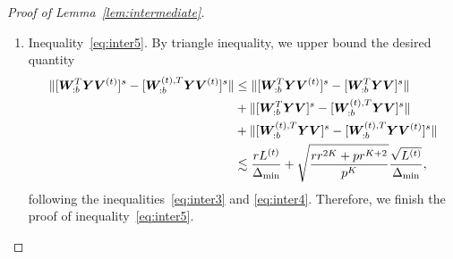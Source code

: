 \documentclass[lettersize,onecolumn,journal]{IEEEtran}
\theoremstyle{definition}
\theoremstyle{definition}
\newcommand{\off}[1]{\left[#1\right]}
\newcommand{\offf}[1]{\left\{#1\right\}}
\begin{document}
\begin{proof}[Proof of Lemma~\ref{lem:intermediate}]
\begin{enumerate}
    \item Inequality~\eqref{eq:inter5}. By triangle inequality, we upper bound the desired quantity 
    \begin{align}
        \lVert [ \bm{W}_{:b}^T \bm Y \bm{V}^{(t)} ]^s   -  [ \bm{W}_{:b}^{(t), T} \bm Y \bm{V}^{(t)} ]^s \rVert &\leq \lVert[ \bm{W}_{:b}^T \bm Y \bm{V}^{(t)} ]^s - [ \bm{W}_{:b}^T \bm Y \bm{V} ]^s \rVert \\
        & + \lVert[\bm{W}_{:b}^T \bm Y \bm{V} ]^s  - [ \bm{W}_{:b}^{(t),T} \bm Y \bm{V} ]^s \rVert \\
        &+ \lVert[\bm{W}_{:b}^{(t),T} \bm Y \bm{V} ]^s  -  [\bm{W}_{:b}^{(t), T} \bm Y \bm{V}^{(t)} ]^s \rVert\\
        &\lesssim \frac{r L^{(t)}}{\Delta_{\min}} + \sqrt{ \frac{rr^{2K} + p r^{K+2}}{p^{K}}}  \frac{\sqrt{L^{(t)}}}{\Delta_{\min}},
    \end{align}
    following the inequalities~\eqref{eq:inter3} and \eqref{eq:inter4}. Therefore, we finish the proof of inequality~\eqref{eq:inter5}.
    \end{enumerate}
    
    \end{proof}
    
\end{document}
